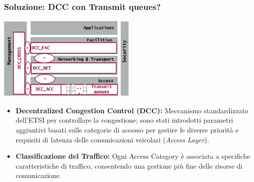 \documentclass{beamer}
\begin{document}
\begin{frame}
    \frametitle{Soluzione: DCC con Transmit queues?}
    \centering
    \includegraphics[width=0.5\textwidth]{dcc_edca.jpg}
    \begin{itemize}
        \item \textbf{Decentralized Congestion Control (DCC):} Meccanismo standardizzato dell'ETSI per controllare la congestione; sono stati introdotti parametri aggiuntivi basati sulle categorie di accesso per gestire le diverse priorità e requisiti di latenza delle comunicazioni veicolari (\textit{Access Layer}).
        \item \textbf{Classificazione del Traffico:} Ogni Access Category è associata a specifiche caratteristiche di traffico, consentendo una gestione più fine delle risorse di comunicazione.
    \end{itemize}
\end{frame}
\end{document}
